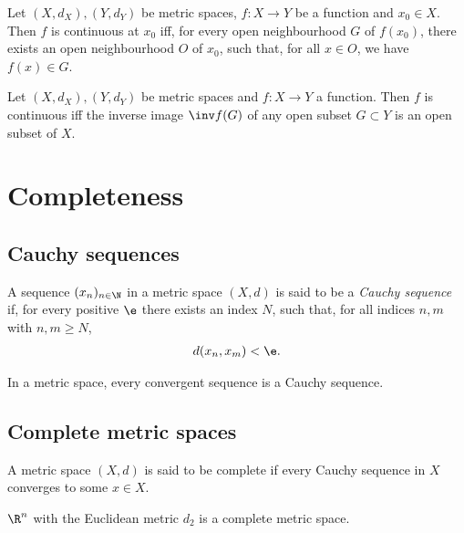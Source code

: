 \documentclass{article}
\begin{document}
\begin{proposition}[Notes 6.2]
    Let $(X,d_X),(Y,d_Y)$ be metric spaces, $f:X\to Y$ be a function and $x_0\in X$. Then $f$ is continuous
    at $x_0$ iff, for every open neighbourhood $G$ of $f(x_0)$, there exists an open neighbourhood $O$ of
    $x_0$, such that, for all $x\in O$, we have $f(x)\in G$.
\end{proposition}

\begin{theorem}[Notes 6.5]
    Let $(X,d_X),(Y,d_Y)$ be metric spaces and $f:X\to Y$ a function. Then $f$ is continuous iff 
    the inverse image $\inv f(G)$ of any open subset $G\subset Y$ is an open subset of $X$.
\end{theorem}

\section{Completeness}

\subsection{Cauchy sequences}

\begin{definition}
    A sequence $(x_n)_{n\in\N}$ in a metric space $(X,d)$ is said to be a \emph{Cauchy sequence}
    if, for every positive $\e$ there exists an index $N$, such that, for all indices $n,m$ with 
    $n,m\geq N$,
    \begin{align*}
        d(x_n,x_m)<\e.
    \end{align*}
\end{definition}

\begin{proposition}[Notes 7.2]
    In a metric space, every convergent sequence is a Cauchy sequence. 
\end{proposition}

\subsection{Complete metric spaces}

\begin{definition}
    A metric space $(X,d)$ is said to be complete if every Cauchy sequence in $X$ converges to some 
    $x\in X$.
\end{definition}

\begin{proposition}[Notes 7.5]
    $\R^n$ with the Euclidean metric $d_2$ is a complete metric space. 
\end{proposition}
\end{document}
